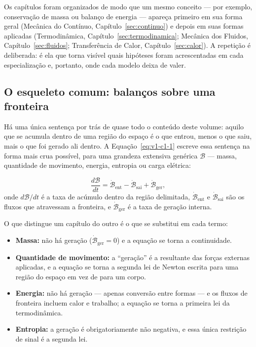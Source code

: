 \documentclass[12pt,a4paper]{article}
\numberwithin{equation}{section}
\numberwithin{table}{section}
\numberwithin{figure}{section}
\begin{document}
Os capítulos foram organizados de modo que um mesmo conceito --- por exemplo,
conservação de massa ou balanço de energia --- apareça primeiro em sua forma
geral (Mecânica do Contínuo, Capítulo~\ref{sec:continuo}) e depois em suas
formas aplicadas (Termodinâmica, Capítulo~\ref{sec:termodinamica}; Mecânica
dos Fluidos, Capítulo~\ref{sec:fluidos}; Transferência de Calor,
Capítulo~\ref{sec:calor}). A repetição é deliberada: é ela que torna visível
quais hipóteses foram acrescentadas em cada especialização e, portanto, onde
cada modelo deixa de valer.

\subsection{O esqueleto comum: balanços sobre uma fronteira}

Há uma única sentença por trás de quase todo o conteúdo deste volume: aquilo
que se acumula dentro de uma região do espaço é o que entrou, menos o que
saiu, mais o que foi gerado ali dentro. A Equação~\eqref{eq:v1-c1-1} escreve
essa sentença na forma mais crua possível, para uma grandeza extensiva
genérica $\mathcal{B}$ --- massa, quantidade de movimento, energia, entropia
ou carga elétrica:

\begin{equation}\label{eq:v1-c1-1}
\frac{d\mathcal{B}}{dt} = \dot{\mathcal{B}}_{\text{ent}} -
\dot{\mathcal{B}}_{\text{sai}} + \dot{\mathcal{B}}_{\text{ger}},
\end{equation}
onde $d\mathcal{B}/dt$ é a taxa de acúmulo dentro da região delimitada,
$\dot{\mathcal{B}}_{\text{ent}}$ e $\dot{\mathcal{B}}_{\text{sai}}$ são os
fluxos que atravessam a fronteira, e $\dot{\mathcal{B}}_{\text{ger}}$ é a taxa
de geração interna.

O que distingue um capítulo do outro é o que se substitui em cada termo:

\begin{itemize}
	\item \textbf{Massa:} não há geração ($\dot{\mathcal{B}}_{\text{ger}}=0$) e
	a equação se torna a continuidade.
	\item \textbf{Quantidade de movimento:} a ``geração'' é a resultante das
	forças externas aplicadas, e a equação se torna a segunda lei de Newton
	escrita para uma região do espaço em vez de para um corpo.
	\item \textbf{Energia:} não há geração --- apenas conversão entre formas
	--- e os fluxos de fronteira incluem calor e trabalho; a equação se torna a
	primeira lei da termodinâmica.
	\item \textbf{Entropia:} a geração é obrigatoriamente não negativa, e essa
	única restrição de sinal é a segunda lei.
\end{itemize}
\end{document}
